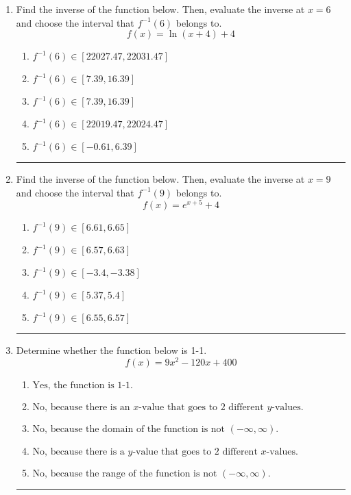 \documentclass[14pt]{extbook}
\newcommand{\litem}[1]{\item#1\hspace*{-1cm}\rule{\textwidth}{0.4pt}}
\begin{document}
\begin{enumerate}
{\begin{enumerate}[label=\Alph*.]
\end{enumerate} }
\litem{
Find the inverse of the function below. Then, evaluate the inverse at $x = 6$ and choose the interval that $f^{-1}(6)$ belongs to.\[ f(x) = \ln{(x+4)}+4 \]\begin{enumerate}[label=\Alph*.]
\item \( f^{-1}(6) \in [22027.47, 22031.47] \)
\item \( f^{-1}(6) \in [7.39, 16.39] \)
\item \( f^{-1}(6) \in [7.39, 16.39] \)
\item \( f^{-1}(6) \in [22019.47, 22024.47] \)
\item \( f^{-1}(6) \in [-0.61, 6.39] \)

\end{enumerate} }
\litem{
Find the inverse of the function below. Then, evaluate the inverse at $x = 9$ and choose the interval that $f^{-1}(9)$ belongs to.\[ f(x) = e^{x+5}+4 \]\begin{enumerate}[label=\Alph*.]
\item \( f^{-1}(9) \in [6.61, 6.65] \)
\item \( f^{-1}(9) \in [6.57, 6.63] \)
\item \( f^{-1}(9) \in [-3.4, -3.38] \)
\item \( f^{-1}(9) \in [5.37, 5.4] \)
\item \( f^{-1}(9) \in [6.55, 6.57] \)

\end{enumerate} }
\litem{
Determine whether the function below is 1-1.\[ f(x) = 9 x^2 - 120 x + 400 \]\begin{enumerate}[label=\Alph*.]
\item \( \text{Yes, the function is 1-1.} \)
\item \( \text{No, because there is an $x$-value that goes to 2 different $y$-values.} \)
\item \( \text{No, because the domain of the function is not $(-\infty, \infty)$.} \)
\item \( \text{No, because there is a $y$-value that goes to 2 different $x$-values.} \)
\item \( \text{No, because the range of the function is not $(-\infty, \infty)$.} \)


\end{enumerate}}
\end{enumerate}
\end{document}
